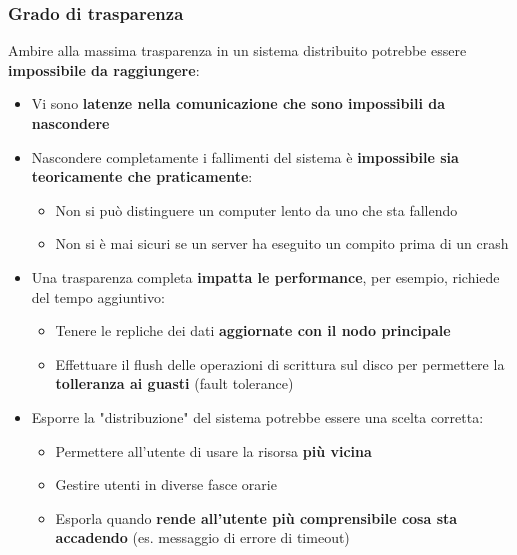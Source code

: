 \documentclass[12pt]{article}
\begin{document}
\subsubsection{Grado di trasparenza}
Ambire alla massima trasparenza in un sistema distribuito potrebbe essere \textbf{impossibile da raggiungere}:
\begin{itemize}
    \item Vi sono \textbf{latenze nella comunicazione che sono impossibili da nascondere}
    \item Nascondere completamente i fallimenti del sistema è \textbf{impossibile sia teoricamente che praticamente}:
          \begin{itemize}
              \item Non si può distinguere un computer lento da uno che sta fallendo
              \item Non si è mai sicuri se un server ha eseguito un compito prima di un crash
          \end{itemize}
    \item Una trasparenza completa \textbf{impatta le performance}, per esempio, richiede del tempo aggiuntivo:
          \begin{itemize}
              \item Tenere le repliche dei dati \textbf{aggiornate con il nodo principale}
              \item Effettuare il flush delle operazioni di scrittura sul disco per permettere la \textbf{tolleranza ai guasti} (fault tolerance)
          \end{itemize}
    \item Esporre la "distribuzione" del sistema potrebbe essere una scelta corretta:
          \begin{itemize}
              \item Permettere all'utente di usare la risorsa \textbf{più vicina}
              \item Gestire utenti in diverse fasce orarie
              \item Esporla quando \textbf{rende all'utente più comprensibile cosa sta accadendo} (es. messaggio di errore di timeout)
          \end{itemize}
\end{itemize}
\newpage
\end{document}
